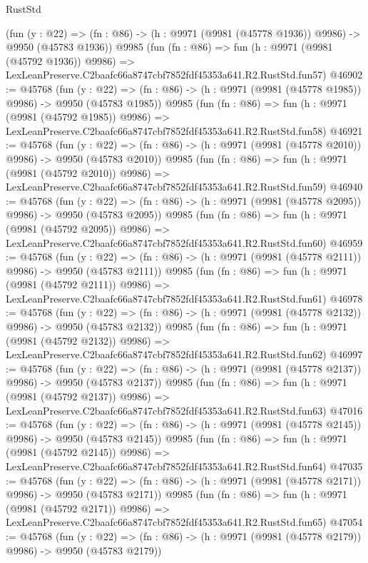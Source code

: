 \begin{lexlean}{RustStd}
\begin{coremodule}
    (fun (y : @22) =>
    (fn : @86) -> (h : @9971 (@9981 (@45778 @1936)) @9986) -> @9950 (@45783 @1936))
    @9985
    (fun (fn : @86) =>
    fun (h : @9971 (@9981 (@45792 @1936)) @9986) =>
    LexLeanPreserve.C2baafc66a8747cbf7852fdf45353a641.R2.RustStd.fun57)
@46902 := @45768
    (fun (y : @22) =>
    (fn : @86) -> (h : @9971 (@9981 (@45778 @1985)) @9986) -> @9950 (@45783 @1985))
    @9985
    (fun (fn : @86) =>
    fun (h : @9971 (@9981 (@45792 @1985)) @9986) =>
    LexLeanPreserve.C2baafc66a8747cbf7852fdf45353a641.R2.RustStd.fun58)
@46921 := @45768
    (fun (y : @22) =>
    (fn : @86) -> (h : @9971 (@9981 (@45778 @2010)) @9986) -> @9950 (@45783 @2010))
    @9985
    (fun (fn : @86) =>
    fun (h : @9971 (@9981 (@45792 @2010)) @9986) =>
    LexLeanPreserve.C2baafc66a8747cbf7852fdf45353a641.R2.RustStd.fun59)
@46940 := @45768
    (fun (y : @22) =>
    (fn : @86) -> (h : @9971 (@9981 (@45778 @2095)) @9986) -> @9950 (@45783 @2095))
    @9985
    (fun (fn : @86) =>
    fun (h : @9971 (@9981 (@45792 @2095)) @9986) =>
    LexLeanPreserve.C2baafc66a8747cbf7852fdf45353a641.R2.RustStd.fun60)
@46959 := @45768
    (fun (y : @22) =>
    (fn : @86) -> (h : @9971 (@9981 (@45778 @2111)) @9986) -> @9950 (@45783 @2111))
    @9985
    (fun (fn : @86) =>
    fun (h : @9971 (@9981 (@45792 @2111)) @9986) =>
    LexLeanPreserve.C2baafc66a8747cbf7852fdf45353a641.R2.RustStd.fun61)
@46978 := @45768
    (fun (y : @22) =>
    (fn : @86) -> (h : @9971 (@9981 (@45778 @2132)) @9986) -> @9950 (@45783 @2132))
    @9985
    (fun (fn : @86) =>
    fun (h : @9971 (@9981 (@45792 @2132)) @9986) =>
    LexLeanPreserve.C2baafc66a8747cbf7852fdf45353a641.R2.RustStd.fun62)
@46997 := @45768
    (fun (y : @22) =>
    (fn : @86) -> (h : @9971 (@9981 (@45778 @2137)) @9986) -> @9950 (@45783 @2137))
    @9985
    (fun (fn : @86) =>
    fun (h : @9971 (@9981 (@45792 @2137)) @9986) =>
    LexLeanPreserve.C2baafc66a8747cbf7852fdf45353a641.R2.RustStd.fun63)
@47016 := @45768
    (fun (y : @22) =>
    (fn : @86) -> (h : @9971 (@9981 (@45778 @2145)) @9986) -> @9950 (@45783 @2145))
    @9985
    (fun (fn : @86) =>
    fun (h : @9971 (@9981 (@45792 @2145)) @9986) =>
    LexLeanPreserve.C2baafc66a8747cbf7852fdf45353a641.R2.RustStd.fun64)
@47035 := @45768
    (fun (y : @22) =>
    (fn : @86) -> (h : @9971 (@9981 (@45778 @2171)) @9986) -> @9950 (@45783 @2171))
    @9985
    (fun (fn : @86) =>
    fun (h : @9971 (@9981 (@45792 @2171)) @9986) =>
    LexLeanPreserve.C2baafc66a8747cbf7852fdf45353a641.R2.RustStd.fun65)
@47054 := @45768
    (fun (y : @22) =>
    (fn : @86) -> (h : @9971 (@9981 (@45778 @2179)) @9986) -> @9950 (@45783 @2179))

\end{coremodule}
\end{lexlean}
